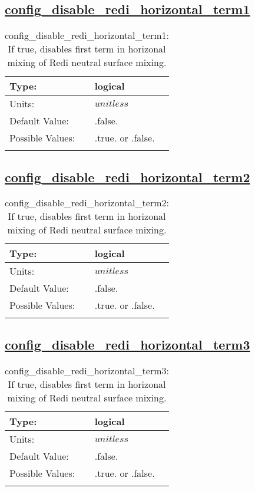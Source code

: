 \subsection[config\_disable\_redi\_horizontal\_term1]{\hyperref[sec:nm_tab_debug]{config\_disable\_redi\_horizontal\_term1}}
\label{subsec:nm_sec_config_disable_redi_horizontal_term1}
\begin{center}
\begin{longtable}{| p{2.0in} || p{4.0in} |}
    \hline
    Type: & logical \\
    \hline
    Units: & $unitless$ \\
    \hline
    Default Value: & .false. \\
    \hline
    Possible Values: & .true. or .false. \\
    \hline
    \caption{config\_disable\_redi\_horizontal\_term1: If true, disables first term in horizonal mixing of Redi neutral surface mixing.}
\end{longtable}
\end{center}
\subsection[config\_disable\_redi\_horizontal\_term2]{\hyperref[sec:nm_tab_debug]{config\_disable\_redi\_horizontal\_term2}}
\label{subsec:nm_sec_config_disable_redi_horizontal_term2}
\begin{center}
\begin{longtable}{| p{2.0in} || p{4.0in} |}
    \hline
    Type: & logical \\
    \hline
    Units: & $unitless$ \\
    \hline
    Default Value: & .false. \\
    \hline
    Possible Values: & .true. or .false. \\
    \hline
    \caption{config\_disable\_redi\_horizontal\_term2: If true, disables first term in horizonal mixing of Redi neutral surface mixing.}
\end{longtable}
\end{center}
\subsection[config\_disable\_redi\_horizontal\_term3]{\hyperref[sec:nm_tab_debug]{config\_disable\_redi\_horizontal\_term3}}
\label{subsec:nm_sec_config_disable_redi_horizontal_term3}
\begin{center}
\begin{longtable}{| p{2.0in} || p{4.0in} |}
    \hline
    Type: & logical \\
    \hline
    Units: & $unitless$ \\
    \hline
    Default Value: & .false. \\
    \hline
    Possible Values: & .true. or .false. \\
    \hline
    \caption{config\_disable\_redi\_horizontal\_term3: If true, disables first term in horizonal mixing of Redi neutral surface mixing.}
\end{longtable}
\end{center}
